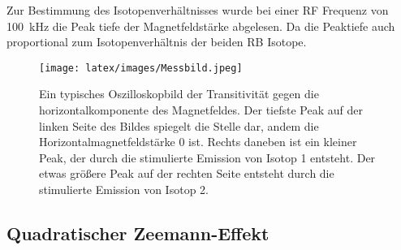 		\noindent
		Zur Bestimmung des Isotopenverhältnisses wurde bei einer RF Frequenz von \SI{100}{\kilo\hertz} die Peak tiefe der Magnetfeldstärke abgelesen. Da die Peaktiefe auch proportional zum Isotopenverhältnis der beiden RB Isotope.
		
		\begin{figure}[H]
			\centering
			\texttt{[image: latex/images/Messbild.jpeg]}
			\caption{Ein typisches Oszilloskopbild der Transitivität gegen die horizontalkomponente des Magnetfeldes. 
			Der tiefste Peak auf der linken Seite des Bildes spiegelt die Stelle dar, andem die Horizontalmagnetfeldstärke 0 ist.
			Rechts daneben ist ein kleiner Peak, der durch die stimulierte Emission von Isotop 1 entsteht. 
			Der etwas größere Peak auf der rechten Seite entsteht durch die stimulierte Emission von Isotop 2.}
		\end{figure}	
	
	\subsection{Quadratischer Zeemann-Effekt}
